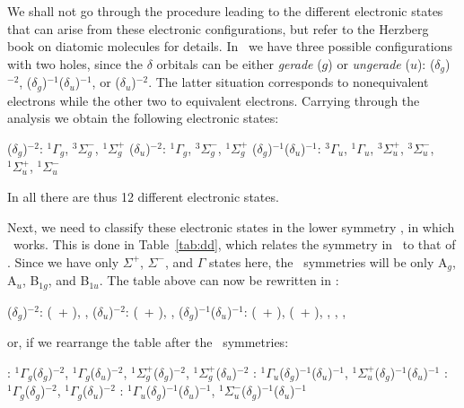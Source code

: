 
We shall not go through the procedure leading to the different electronic
states that can arise from these electronic configurations, but refer to
the Herzberg book on diatomic molecules \cite{Herzberg:66} for details. In
\Dinfh\ we have three possible configurations with two holes, since the
$\delta$ orbitals can be either {\em gerade} ($g$) or {\em ungerade} ($u$):
($\delta_g$)$^{-2}$, ($\delta_g$)$^{-1}$($\delta_u$)$^{-1}$, or ($\delta_u$)$^{-2}$.
The latter situation corresponds to nonequivalent electrons while the other
two to equivalent electrons.
Carrying through the analysis we obtain the following electronic states:

($\delta_g$)$^{-2}$\hspace*{1cm}: $^1\Gamma_g$, $^3\Sigma_g^-$, $^1\Sigma_g^+$ \newline
($\delta_u$)$^{-2}$\hspace*{1cm}: $^1\Gamma_g$, $^3\Sigma_g^-$, $^1\Sigma_g^+$ \newline
($\delta_g$)$^{-1}$($\delta_u$)$^{-1}$: $^3\Gamma_u$, $^1\Gamma_u$, $^3\Sigma_u^+$, 
$^3\Sigma_u^-$, $^1\Sigma_u^+$, $^1\Sigma_u^-$

In all there are thus 12 different electronic states.

Next, we need to classify these electronic states in the lower symmetry 
\Dth, in which \molcas\ works. This is done in Table~\ref{tab:dd}, which
relates the symmetry in \Dinfh\ to that of \Dth. Since we have only
$\Sigma^+$, $\Sigma^-$, and $\Gamma$ states here, the \Dth\ symmetries
will be only A$_g$, A$_u$, B$_{1g}$, and B$_{1u}$. The table above can
now be rewritten in \Dth:

($\delta_g$)$^{-2}$\hspace*{1cm}: (\SAOG\ + \SBOG), \TBOG, \SAOG \newline
($\delta_u$)$^{-2}$\hspace*{1cm}: (\SAOG\ + \SBOG), \TBOG, \SAOG \newline
($\delta_g$)$^{-1}$($\delta_u$)$^{-1}$: (\TAOU\ + \TBOU), (\SAOU\ + \SBOU),
\TBOU, \TAOU, \SBOU, \SAOU

or, if we rearrange the table after the \Dth\ symmetries:

\SAOG: $^1\Gamma_g$($\delta_g$)$^{-2}$, $^1\Gamma_g$($\delta_u$)$^{-2}$, 
       $^1\Sigma_g^+$($\delta_g$)$^{-2}$, $^1\Sigma_g^+$($\delta_u$)$^{-2}$\newline
\SBOU: $^1\Gamma_u$($\delta_g$)$^{-1}$($\delta_u$)$^{-1}$, 
       $^1\Sigma_u^+$($\delta_g$)$^{-1}$($\delta_u$)$^{-1}$\newline
\SBOG: $^1\Gamma_g$($\delta_g$)$^{-2}$, $^1\Gamma_g$($\delta_u$)$^{-2}$\newline
\SAOU: $^1\Gamma_u$($\delta_g$)$^{-1}$($\delta_u$)$^{-1}$, 
       $^1\Sigma_u^-$($\delta_g$)$^{-1}$($\delta_u$)$^{-1}$

